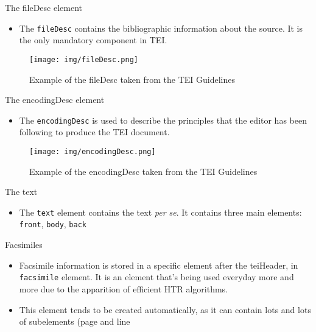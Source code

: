 \documentclass[11pt,aspectratio=1610]{beamer}
\begin{document}
\begin{frame}{The fileDesc element}
\begin{itemize}
\item The \texttt{fileDesc} contains the bibliographic information about the source. It is the only mandatory component in TEI.
\end{itemize}
\begin{center}
\begin{figure}
\texttt{[image: img/fileDesc.png]}
\caption{Example of the fileDesc taken from the TEI Guidelines}
\end{figure}
\end{center}
\end{frame}


\begin{frame}{The encodingDesc element}
\begin{itemize}
\item The \texttt{encodingDesc} is used to describe the principles that the editor has been following to produce the TEI document. 
\end{itemize}
\begin{center}
\begin{figure}
\texttt{[image: img/encodingDesc.png]}
\caption{Example of the encodingDesc taken from the TEI Guidelines}
\end{figure}
\end{center}
\end{frame}





\begin{frame}{The text}
\begin{itemize}
\item The \texttt{text} element contains the text \textit{per se}. It contains three main elements: \texttt{front}, \texttt{body}, \texttt{back}
\end{itemize}
\end{frame}


\begin{frame}{Facsimiles}
\begin{itemize}
\item Facsimile information is stored in a specific element after the teiHeader, in \texttt{facsimile} element. It is an element that's being used everyday more and more due to the apparition of efficient HTR algorithms.
\item This element tends to be created automatically, as it can contain lots and lots of subelements (page and line 
\end{itemize}
\end{frame}
\end{document}
